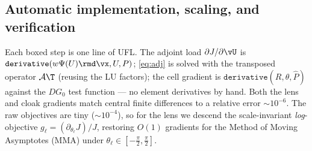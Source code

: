 \documentclass[11pt]{article}
\begin{document}
\subsection{Automatic implementation, scaling, and verification}
Each boxed step is one line of UFL. The adjoint load $\partial J/\partial\vU$ is
$\texttt{derivative}(w\Psi(U)\rmd\vx,U,P)$; \eqref{eq:adj} is solved with the
transposed operator $\mathcal A\T$ (reusing the LU factors); the cell gradient is
$\texttt{derivative}(R,\theta,\hat P)$ against the $DG_0$ test function --- no
element derivatives by hand. Both the lens and cloak gradients match central
finite differences to a relative error $\sim\!10^{-6}$. The raw objectives are
tiny ($\sim\!10^{-4}$), so for the lens we descend the scale-invariant
\emph{log}-objective $g_\ell=(\partial_{\theta_\ell}J)/J$, restoring $O(1)$
gradients for the Method of Moving Asymptotes (MMA) under
$\theta_\ell\in[-\tfrac\pi2,\tfrac\pi2]$.
\end{document}

